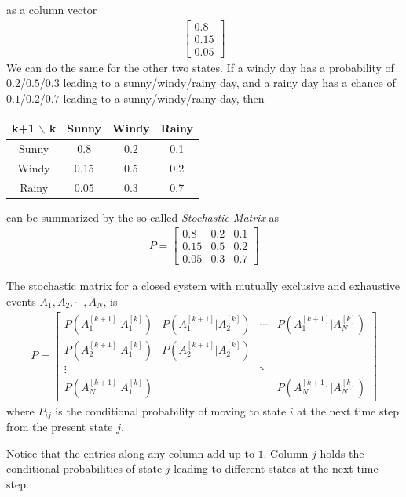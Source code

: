 as a column vector
\begin{align*}
\begin{bmatrix}
0.8 \\
0.15 \\
0.05
\end{bmatrix}
\end{align*}
We can do the same for the other two states. If a windy day has a probability of $0.2$/$0.5$/$0.3$ leading to a sunny/windy/rainy day, and a rainy day has a chance of $0.1$/$0.2$/$0.7$ leading to a sunny/windy/rainy day, then
\begin{center}
\begin{tabular}{|c|c|c|c|}
\hline
k+1 $\backslash$ k & Sunny & Windy & Rainy \\
\hline
Sunny & 0.8 & 0.2 & 0.1\\
\hline
Windy & 0.15 & 0.5 & 0.2 \\
\hline 
Rainy & 0.05 & 0.3 & 0.7 \\
\hline
\end{tabular}
\end{center}
can be summarized by the so-called \textit{Stochastic Matrix} as
\begin{align*}
P = 
\begin{bmatrix}
0.8 & 0.2 & 0.1\\
0.15 & 0.5 & 0.2 \\
0.05 & 0.3 & 0.7
\end{bmatrix}
\end{align*}
\begin{defn}
\label{1401}
The stochastic matrix for a closed system with mutually exclusive and exhaustive events $A_1, A_2, \cdots, A_N$, is
\begin{align*}
P =
\begin{bmatrix}
P(A_1^{[k+1]}|A_1^{[k]}) & P(A_1^{[k+1]}|A_2^{[k]}) & \cdots & P(A_1^{[k+1]}|A_N^{[k]})\\
P(A_2^{[k+1]}|A_1^{[k]}) & P(A_2^{[k+1]}|A_2^{[k]}) & & \\
\vdots & & \ddots & \\
P(A_N^{[k+1]}|A_1^{[k]}) & & & P(A_N^{[k+1]}|A_N^{[k]})
\end{bmatrix}
\end{align*}
where $P_{ij}$ is the conditional probability of moving to state $i$ at the next time step from the present state $j$.
\end{defn}
Notice that the entries along any column add up to $1$. Column $j$ holds the conditional probabilities of state $j$ leading to different states at the next time step.


